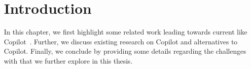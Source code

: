 \label{chapter:background}

\newlength{\savedunitlength}
\setlength{\unitlength}{2em}

\section{Introduction}
In this chapter, we first highlight some related work leading towards current \cct{} like Copilot~\cite{Copilot-web}. Further, we discuss existing research on Copilot and alternatives to Copilot. Finally, we conclude by providing some details regarding the challenges with \cct{} that we further explore in this thesis.








\setlength{\unitlength}{\savedunitlength}
